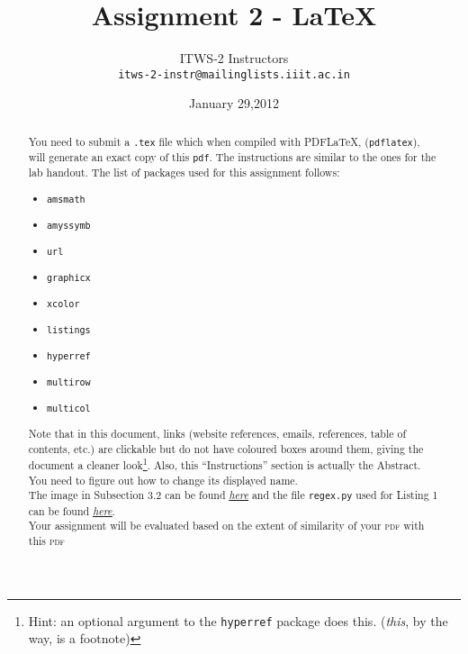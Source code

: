 \documentclass{article}
\title{\textbf{Assignment 2 - {\LaTeX}}}
\author{ITWS-2 Instructors\\ \texttt{itws-2-instr@mailinglists.iiit.ac.in}}
\date{January 29,2012}
\begin{document}
\maketitle
\hline
\begin{abstract}
You need to submit a \texttt{.tex} file which when compiled with PDF{\LaTeX},
(\texttt{pdflatex}), will generate an exact copy of this \texttt{pdf}. The instructions are similar to the ones for the lab handout. The list of packages used for this assignment follows:

\begin{multicols}{3}
\begin{itemize}
\item \texttt{amsmath}
\item \texttt{amyssymb}
\item \texttt{url}
\item \texttt{graphicx}
\item \texttt{xcolor}
\item \texttt{listings}
\item \texttt{hyperref}
\item \texttt{multirow}
\item \texttt{multicol}
\end{itemize}
\end{multicols}

Note that in this document, links (website references, emails, refer\-ences, table of contents, etc.) are clickable but do not have coloured boxes around them, giving the document a cleaner look\footnote{Hint: an optional argument to the \texttt{hyperref} package does this. (\emph{this}, by the way, is a footnote)}. Also, this ``Instructions'' section is actually the Abstract. You need to figure out how to change its displayed name.\\

The image in Subsection 3.2 can be found \href{http://pascal.iiit.ac.in/~sankalp/itws2/latexassignment/latex.png}{\textit{\underline{here}}} and the file \texttt{regex.py} used for Listing 1 can be found \href{http://pascal.iiit.ac.in/~sankalp/itws2/latexassignment/regex.py}{\textit{\underline{here}}}.\\

Your assignment will be evaluated based on the extent of similarity of your \textsc{pdf} with this \textsc{pdf}
\end{abstract}
\newpage
\tableofcontents
\newpage
\end{document}
